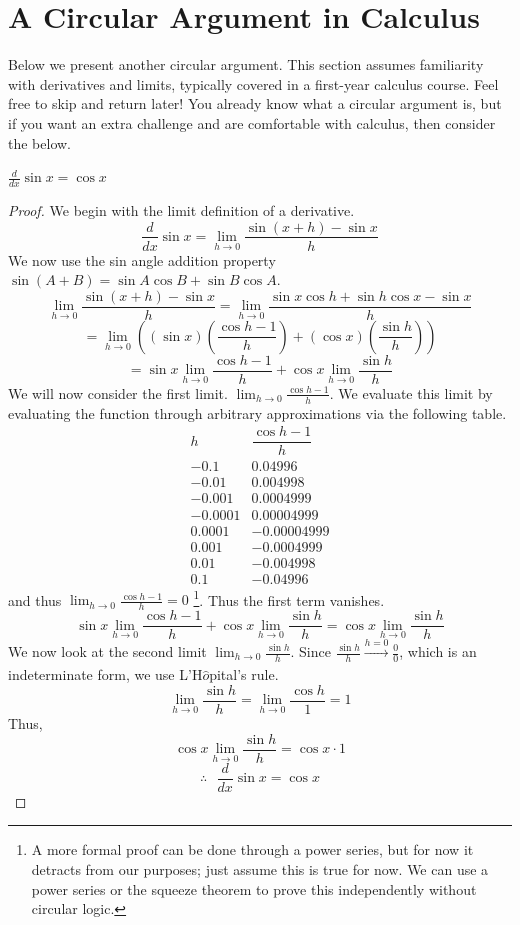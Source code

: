 \section{A Circular Argument in Calculus}
Below we present another circular argument. This section assumes familiarity with derivatives and limits, typically covered in a first-year calculus course. Feel free to skip and return later! You already know what a circular argument is, but if you want an extra challenge and are comfortable with calculus, then consider the below.
\begin{theorem}
$\frac{d}{dx}\sin x = \cos x$
\end{theorem}
\begin{proof}
We begin with the limit definition of a derivative. 
\[
\frac{d}{dx}\sin x = \lim_{h \to 0} \frac{\sin(x+h) - \sin x}{h}
\]
We now use the sin angle addition property $\sin(A + B) = \sin A \cos B + \sin B \cos A$.
\[
\lim_{h \to 0} \frac{\sin(x+h) - \sin x}{h} = \lim_{h \to 0} \frac{\sin x \cos h + \sin h \cos x - \sin x}{h}
\]
\[
= \lim_{h \to 0} \left((\sin x) \left(\frac{\cos h - 1}{h}\right) + (\cos x)\left( \frac{\sin h}{h}\right) \right)
\]
\[
= \sin x\lim_{h \to 0}\frac{\cos h - 1}{h} + \cos x \lim_{h \to 0}  \frac{\sin h}{h}
\]
We will now consider the first limit. $\lim_{h \to 0}\frac{\cos h - 1}{h}$. We evaluate this limit by evaluating the function through arbitrary approximations via the following table. 
\[
\begin{array}{c|c}
h & \dfrac{\cos h - 1}{h} \\ \hline
-0.1 & 0.04996 \\
-0.01 & 0.004998 \\
-0.001 & 0.0004999 \\
-0.0001 & 0.00004999 \\ \hline
0.0001 & -0.00004999 \\
0.001 & -0.0004999 \\
0.01 & -0.004998 \\
0.1 & -0.04996
\end{array}
\]
and thus $\lim_{h \to 0}\frac{\cos h - 1}{h} = 0$ \footnote{A more formal proof can be done through a power series, but for now it detracts from our purposes; just assume this is true for now.  We can use a power series or the squeeze theorem to prove this independently without circular logic. }. Thus the first term vanishes. 
\[
\sin x\lim_{h \to 0}\frac{\cos h - 1}{h} + \cos x \lim_{h \to 0}  \frac{\sin h}{h} = \cos x \lim_{h \to 0}  \frac{\sin h}{h}
\]
We now look at the second limit $\lim_{h \to 0}  \frac{\sin h}{h}$. Since $\frac{\sin h}{h} \xrightarrow[]{h=0}  \frac{0}{0}$, which is an indeterminate form, we use L'H$\hat{o}$pital's rule. 
\[
\lim_{h \to 0}  \frac{\sin h}{h} = \lim_{h \to 0}  \frac{\cos h}{1} = 1
\]
Thus, 
\[
\cos x \lim_{h \to 0}  \frac{\sin h}{h} = \cos x \cdot 1
\]
\[
\therefore ~~~ \frac{d}{dx}\sin x = \cos x
\]
\end{proof}
